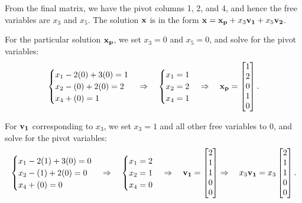 \begin{solution}
    From the final matrix, we have the pivot columns 1, 2, and 4, and hence the free variables
    are $x_3$ and $x_5$. The solution $\bm{\mathrm{x}}$ is in the form $\bm{\mathrm{x}} = \bm{\mathrm{x_p}} + x_3\bm{\mathrm{v_1}} +
    x_5\bm{\mathrm{v_2}}$.

    For the particular solution $\bm{\mathrm{x_p}}$, we set $x_3 = 0$ and $x_5 = 0$, and solve for the
    pivot variables:
    \[
        \begin{cases}
            x_1 - 2(0) + 3(0) = 1 \\
            x_2 - (0) + 2(0) = 2 \\
            x_4 + (0) = 1
        \end{cases}
        \Rightarrow\quad
        \begin{cases}
            x_1 = 1 \\
            x_2 = 2 \\
            x_4 = 1
        \end{cases}
        \Rightarrow\quad
        \bm{\mathrm{x_p}} = \begin{bmatrix}
            1 \\ 2 \\ 0 \\ 1 \\ 0
        \end{bmatrix}.
    \]

    For $\bm{\mathrm{v_1}}$ corresponding to $x_3$, we set $x_3 = 1$ and all other free variables to 0, and
    solve for the pivot variables:
    \[
        \begin{cases}
            x_1 - 2(1) + 3(0) = 0 \\
            x_2 - (1) + 2(0) = 0 \\
            x_4 + (0) = 0
        \end{cases}
        \Rightarrow\quad
        \begin{cases}
            x_1 = 2 \\
            x_2 = 1 \\
            x_4 = 0
        \end{cases}
        \Rightarrow\quad
        \bm{\mathrm{v_1}} = \begin{bmatrix}
            2 \\ 1 \\ 1 \\ 0 \\ 0
        \end{bmatrix}
        \Rightarrow\quad
        x_3\bm{\mathrm{v_1}} = x_3\begin{bmatrix}
            2 \\ 1 \\ 1 \\ 0 \\ 0
        \end{bmatrix}.
    \]


\end{solution}
